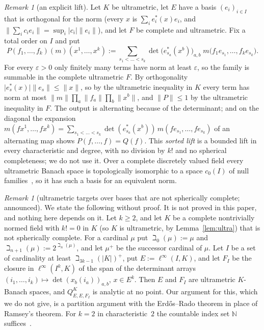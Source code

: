 \documentclass[11pt]{amsart}
\theoremstyle{definition}
\theoremstyle{remark}
\newtheorem{remark}[theorem]{Remark}
\numberwithin{equation}{section}
\newcommand{\linf}{\ell^\infty}
\newcommand{\N}{\mathbb{N}}
\newcommand{\abs}[1]{\lvert #1\rvert}
\newcommand{\norm}[1]{\lVert #1\rVert}
\begin{document}
\begin{remark}[an explicit lift]\label{rem:sorted}
Let $K$ be ultrametric, let $E$ have a basis $(e_i)_{i\in I}$ that is orthogonal for the norm (every $x$ is
$\sum_ie^*_i(x)e_i$, and $\norm{\sum_ic_ie_i}=\sup_i\abs{c_i}\norm{e_i}$), and let $F$ be complete and ultrametric. Fix a
total order on $I$ and put
\[
P(f_1,\dots,f_k)(m)(x^1,\dots,x^k):=\sum_{s_1<\dots<s_k}\det\bigl(e^*_{s_a}(x^b)\bigr)_{a,b}\;m\bigl(f_1e_{s_1},\dots,f_ke_{s_k}\bigr).
\]
For every $\varepsilon>0$ only finitely many terms have norm at least $\varepsilon$, so the family is summable in the
complete ultrametric $F$. By orthogonality $\abs{e^*_s(x)}\norm{e_s}\le\norm x$, so by the ultrametric
inequality in $K$ every term has norm at most $\norm m\prod_a\norm{f_a}\prod_b\norm{x^b}$, and $\norm P\le1$ by the
ultrametric inequality in $F$. The output is alternating because of the determinant; and on the diagonal the expansion
$m(fx^1,\dots,fx^k)=\sum_{s_1<\dots<s_k}\det(e^*_{s_a}(x^b))\,m(fe_{s_1},\dots,fe_{s_k})$ of an alternating map shows
$P(f,\dots,f)=Q(f)$. This \emph{sorted lift} is a bounded lift in every characteristic and degree, with no division by
$k!$ and no spherical completeness; we do not use it. Over a complete discretely valued field every ultrametric Banach
space is topologically isomorphic to a space $c_0(I)$ of null families~\cite[\S1, Prop.~1 and its Corollaire]{Se}, so
it has such a basis for an equivalent norm.
\end{remark}

\begin{remark}[ultrametric targets over bases that are not spherically complete; announced]\label{rem:R}
We state the following without proof. It is not proved in this paper, and nothing here depends on it. Let $k\ge2$, and
let $K$ be a complete nontrivially normed field with $k!=0$ in $K$ (so $K$ is ultrametric, by Lemma~\ref{lem:ultra})
that is not spherically complete. For a cardinal $\mu$ put $\beth_0(\mu):=\mu$ and
$\beth_{n+1}(\mu):=2^{\beth_n(\mu)}$, and let $\mu^+$ be the successor cardinal of $\mu$. Let $I$ be a set of
cardinality at least $\beth_{3k-1}(\abs K)^+$, put $E:=\linf(I,K)$, and let $F_I$ be the closure in $\linf(I^k,K)$ of
the span of the determinant arrays $(i_1,\dots,i_k)\mapsto\det(x_b(i_a))_{a,b}$, $x\in E^k$. Then $E$ and $F_I$ are
ultrametric $K$\nobreakdash-Banach spaces, and $Q^K_{E,E,F_I}$ is analytic at no point. Our argument for this, which we do not
give, is a partition argument with the Erd\H{o}s--Rado theorem in place of Ramsey's theorem. For $k=2$ in
characteristic~$2$ the countable index set $\N$ suffices~\cite{M}.
\end{remark}
\end{document}
